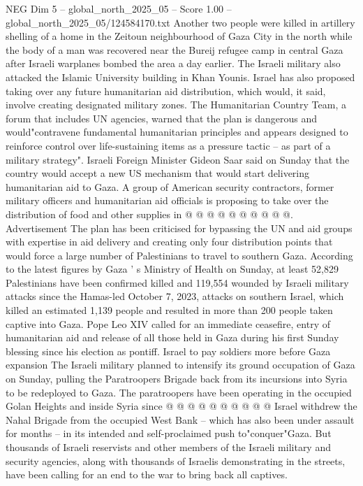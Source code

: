 \begin{textsample}{NEG Dim 5 – global\_north\_2025\_05 – Score 1.00 – global\_north\_2025\_05/124584170.txt}  \label{ex:f5_neg_329}
Another two people were killed in artillery shelling of a home in the Zeitoun neighbourhood of Gaza City in the north while the body of a man was recovered near the Bureij refugee camp in central Gaza after Israeli warplanes bombed the area a day earlier.
The Israeli military also attacked the Islamic University building in Khan Younis.
Israel has also proposed taking over any future humanitarian aid distribution, which would, it said, involve creating designated military zones.
The Humanitarian Country Team, a forum that includes UN agencies, warned that the plan is dangerous and would"contravene fundamental humanitarian principles and appears designed to reinforce control over life-sustaining items as a pressure tactic -- as part of a military strategy".
Israeli Foreign Minister Gideon Saar said on Sunday that the country would accept a new US mechanism that would start delivering humanitarian aid to Gaza.
A group of American security contractors, former military officers and humanitarian aid officials is proposing to take over the distribution of food and other supplies in @ @ @ @ @ @ @ @ @ @.
Advertisement The plan has been criticised for bypassing the UN and aid groups with expertise in aid delivery and creating only four distribution points that would force a large number of Palestinians to travel to southern Gaza.
According to the latest figures by Gaza ' s Ministry of Health on Sunday, at least 52,829 Palestinians have been confirmed killed and 119,554 wounded by Israeli military attacks since the Hamas-led October 7, 2023, attacks on southern Israel, which killed an estimated 1,139 people and resulted in more than 200 people taken captive into Gaza.
Pope Leo XIV called for an immediate ceasefire, entry of humanitarian aid and release of all those held in Gaza during his first Sunday blessing since his election as pontiff.
Israel to pay soldiers more before Gaza expansion The Israeli military planned to intensify its ground occupation of Gaza on Sunday, pulling the Paratroopers Brigade back from its incursions into Syria to be redeployed to Gaza.
The paratroopers have been operating in the occupied Golan Heights and inside Syria since @ @ @ @ @ @ @ @ @ @ Israel withdrew the Nahal Brigade from the occupied West Bank -- which has also been under assault for months -- in its intended and self-proclaimed push to"conquer"Gaza.
But thousands of Israeli reservists and other members of the Israeli military and security agencies, along with thousands of Israelis demonstrating in the streets, have been calling for an end to the war to bring back all captives.

\end{textsample}

